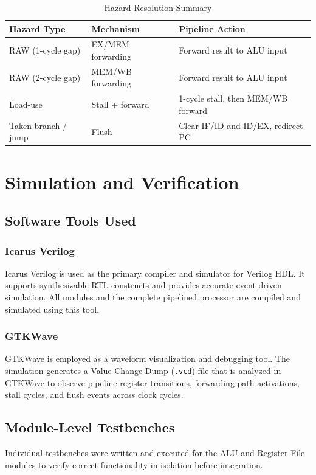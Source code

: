 \documentclass[12pt,a4paper]{report}
\begin{document}
\begin{table}[H]
\centering
\caption{Hazard Resolution Summary}
\label{tab:hazard_summary}
\begin{tabular}{L{3.5cm} L{2.8cm} L{5.0cm}}
    \toprule
    \textbf{Hazard Type} & \textbf{Mechanism} & \textbf{Pipeline Action} \\
    \midrule
    RAW (1-cycle gap)    & EX/MEM forwarding  & Forward result to ALU input \\
    RAW (2-cycle gap)    & MEM/WB forwarding  & Forward result to ALU input \\
    Load-use             & Stall + forward    & 1-cycle stall, then MEM/WB forward \\
    Taken branch / jump  & Flush              & Clear IF/ID and ID/EX, redirect PC \\
    \bottomrule
\end{tabular}
\end{table}


\chapter{Simulation and Verification}

\section{Software Tools Used}

\subsection{Icarus Verilog}
Icarus Verilog is used as the primary compiler and simulator for Verilog HDL. It
supports synthesizable RTL constructs and provides accurate event-driven simulation.
All modules and the complete pipelined processor are compiled and simulated using
this tool.

\subsection{GTKWave}
GTKWave is employed as a waveform visualization and debugging tool. The simulation
generates a Value Change Dump (\texttt{.vcd}) file that is analyzed in GTKWave to
observe pipeline register transitions, forwarding path activations, stall cycles,
and flush events across clock cycles.

\section{Module-Level Testbenches}
Individual testbenches were written and executed for the ALU and Register File modules
to verify correct functionality in isolation before integration.
\end{document}

